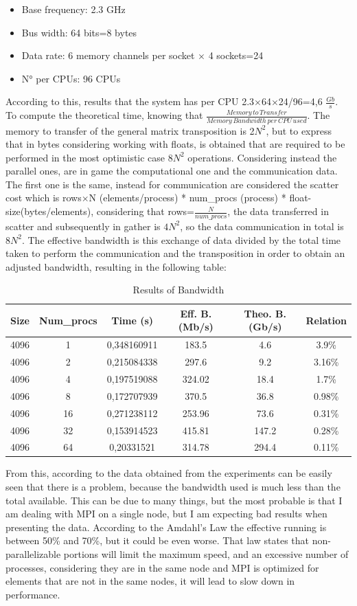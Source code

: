 \begin{itemize}
    \item Base frequency: 2.3 GHz
    \item Bus width: 64 bits=8 bytes
    \item Data rate: 6 memory channels per socket $\times$ 4 sockets=24
    \item N° per CPUs: 96 CPUs
\end{itemize}
According to this, results that the system has per CPU 2.3$\times$64$\times$24/96=4,6 $\frac{Gb}{s}$. To compute the theoretical time, knowing that $\frac{Memory\,to\,Transfer}{Memory\,Bandwidth\,per\,CPU\,used}$. The memory to transfer of the general matrix transposition is 2$N^2$, but to express that in bytes considering working with floats, is obtained that are required to be performed in the most optimistic case 8$N^2$ operations. Considering instead the parallel ones, are in game the computational one and the communication data. The first one is the same, instead for communication are considered the scatter cost which is rows$\times$N (elements/process) * num\_procs (process) * float-size(bytes/elements), considering that rows=$\frac{N}{num\_procs}$, the data transferred in scatter and subsequently in gather is $4N^2$, so the data communication in total is $8N^2$. The effective bandwidth is this exchange of data divided by the total time taken to perform the communication and the transposition in order to obtain an adjusted bandwidth, resulting in the following table:
\begin{table}[!h]
    \centering
    \begin{tabular}{|c|c|c|c|c|c|}
        \hline
        Size & Num\_procs & Time (s) & Eff. B. (Mb/s) & Theo. B. (Gb/s) & Relation\\
        \hline
        4096 & 1 & 0,348160911 & 183.5 & 4.6 & 3.9\%\\
        4096 & 2 & 0,215084338 & 297.6 & 9.2 & 3.16\%\\
        4096 & 4 & 0,197519088 & 324.02 & 18.4 & 1.7\%\\
        4096 & 8 & 0,172707939 & 370.5 & 36.8 & 0.98\%\\
        4096 & 16 & 0,271238112 & 253.96 & 73.6 & 0.31\%\\
        4096 & 32 & 0,153914523 & 415.81 & 147.2 & 0.28\%\\
        4096 & 64 & 0,20331521 & 314.78 & 294.4 & 0.11\%\\
        \hline
    \end{tabular}
    \caption{Results of Bandwidth}
\end{table}
From this, according to the data obtained from the experiments can be easily seen that there is a problem, because the bandwidth used is much less than the total available. This can be due to many things, but the most probable is that I am dealing with MPI on a single node, but I am expecting bad results when presenting the data.
According to the Amdahl's Law\cite{amdahls-law} the effective running is between 50\% and 70\%, but it could be even worse. That law states that non-parallelizable portions will limit the maximum speed, and an excessive number of processes, considering they are in the same node and MPI is optimized for elements that are not in the same nodes, it will lead to slow down in performance.
